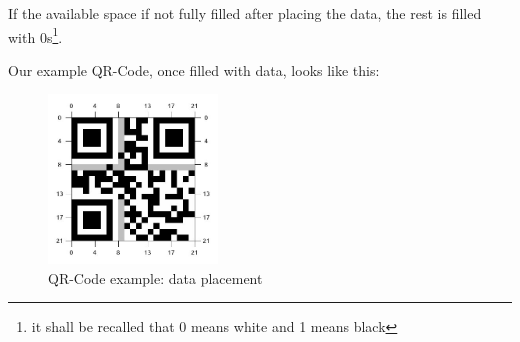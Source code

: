 If the available space if not fully filled after placing the data, the rest is filled with 0s\footnote{it shall be recalled that 0 means white and 1 means black}.

Our example QR-Code, once filled with data, looks like this:

\begin{figure}[H]
  \centering
  \includegraphics[width=0.4\textwidth]{images/qr_plcmt}
  \caption{QR-Code example: data placement}
  \label{fig:qr_plcmt}
\end{figure}

